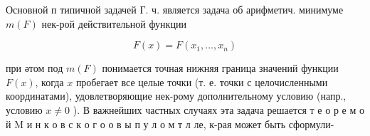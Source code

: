 \documentclass[10pt]{article}
\begin{document}
Основной п типичной задачей $Г$. ч. является задача об арифметич. минимуме $m(F)$ нек-рой действительной функции



\[

F(x)=F\left(x_{1}, \ldots, x_{n}\right)

\]



при әтом под $m(F)$ понимается точная нижняя граница значений функции $F(x)$, когда $x$ пробегает все целые точки (т. е. точки с целочисленными координатами), удовлетворяющие нек-рому дополнительному условию (напр., условию $x \neq 0$ ). В важнейших частных случаях эта задача решается т е о р е м о й $\mathrm{M}$ и н к о в с к о г о о в ы п у л о м т л ле, к-рая может быть сформули-
\end{document}
